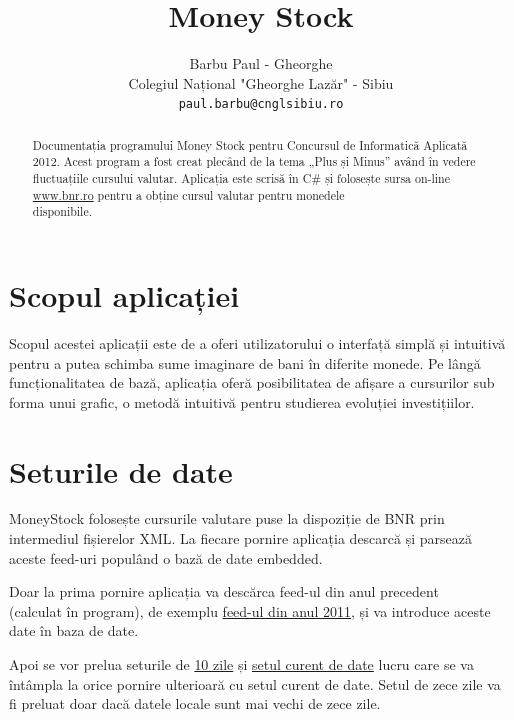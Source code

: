 \documentclass[13pt,a4paper]{report}
\begin{document}
\title{Money Stock}
\author{Barbu Paul - Gheorghe\\
Colegiul Național "Gheorghe Lazăr" - Sibiu\\
\texttt{paul.barbu@cnglsibiu.ro}}
\date{}
\maketitle

\begin{abstract}
Documentația programului Money Stock pentru Concursul de Informatică Aplicată
2012.
Acest program a fost creat plecând de la tema „Plus și Minus” având în vedere
fluctuațiile cursului valutar.
Aplicația este scrisă în C\# și folosește sursa on-line
\href{http://bnr.ro}{www.bnr.ro} pentru a
obține cursul valutar pentru monedele \\ disponibile.
\end{abstract}

\section{Scopul aplicației}
Scopul acestei aplicații este de a oferi utilizatorului o interfață simplă și
intuitivă pentru a putea schimba sume imaginare de bani în diferite monede.
Pe lângă funcționalitatea de bază, aplicația oferă posibilitatea de afișare a
cursurilor sub forma unui grafic, o metodă intuitivă pentru studierea evoluției
investițiilor.

\section{Seturile de date}
MoneyStock folosește cursurile valutare puse la dispoziție de BNR prin \\
intermediul fișierelor XML.
La fiecare pornire aplicația descarcă și parsează aceste feed-uri populând o bază
de date embedded.

Doar la prima pornire aplicația va descărca feed-ul din anul precedent \\ (calculat în
program), de exemplu
\href{http://bnr.ro/files/xml/years/nbrfxrates2011.xml}{feed-ul din anul 2011}, 
și va introduce aceste date în baza de date.

Apoi se vor prelua seturile de \href{http://bnr.ro/nbrfxrates10days.xml}{10
zile} și \href{http://bnr.ro/nbrfxrates.xml}{setul curent de date} lucru care se
va întâmpla la orice pornire ulterioară cu setul curent de date.
Setul de zece zile va fi preluat doar dacă datele locale sunt mai
vechi de zece zile.
\end{document}
